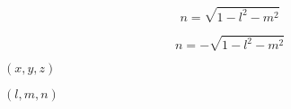\documentclass{article}
\begin{document}
\[ n = \sqrt{1 - l^2 - m^2} \]
\pagebreak

\[ n = - \sqrt{1 - l^2 - m^2} \]
\pagebreak

$(x,y,z)$
\pagebreak

$(l,m,n)$
\pagebreak
\end{document}
